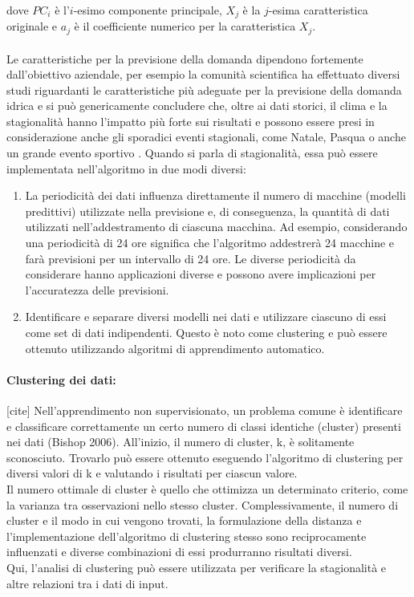 \documentclass[12pt,a4paper]{report}
\begin{document}
dove $PC_i$ è l'$i$-esimo componente principale, $X_j$ è la $j$-esima caratteristica originale e $a_j$ è il coefficiente numerico per la caratteristica $X_j$.\\
\\
Le caratteristiche per la previsione della domanda dipendono fortemente dall'obiettivo aziendale, per esempio la comunità scientifica ha effettuato diversi studi riguardanti le caratteristiche più adeguate per la previsione della domanda idrica e si può genericamente concludere che, oltre ai dati storici, il clima e la stagionalità hanno l'impatto più forte sui risultati e possono essere presi in considerazione anche gli sporadici eventi stagionali, come Natale, Pasqua o anche un grande evento sportivo \cite{makridakis2018statistical}.
Quando si parla di stagionalità, essa può essere implementata nell'algoritmo in due modi diversi:
\begin{enumerate}
    \item La periodicità dei dati influenza direttamente il numero di macchine (modelli predittivi) utilizzate nella previsione e, di conseguenza, la quantità di dati utilizzati nell'addestramento di ciascuna macchina. Ad esempio, considerando una periodicità di 24 ore significa che l'algoritmo addestrerà 24 macchine e farà previsioni per un intervallo di 24 ore. Le diverse periodicità da considerare hanno applicazioni diverse e possono avere implicazioni per l'accuratezza delle previsioni.
    \item Identificare e separare diversi modelli nei dati e utilizzare ciascuno di essi come set di dati indipendenti. Questo è noto come clustering e può essere ottenuto utilizzando algoritmi di apprendimento automatico.
\end{enumerate}

\paragraph*{Clustering dei dati:} [cite]
Nell'apprendimento non supervisionato, un problema comune è identificare e classificare correttamente un certo numero di classi identiche (cluster) presenti nei dati (Bishop 2006). All'inizio, il numero di cluster, k, è solitamente sconosciuto. Trovarlo può essere ottenuto eseguendo l'algoritmo di clustering per diversi valori di k e valutando i risultati per ciascun valore.\\
Il numero ottimale di cluster è quello che ottimizza un determinato criterio, come la varianza tra osservazioni nello stesso cluster.
Complessivamente, il numero di cluster e il modo in cui vengono trovati, la formulazione della distanza e l'implementazione dell'algoritmo di clustering stesso sono reciprocamente influenzati e diverse combinazioni di essi produrranno risultati diversi.\\
Qui, l'analisi di clustering può essere utilizzata per verificare la stagionalità e altre relazioni tra i dati di input.\\
\\
\end{document}
